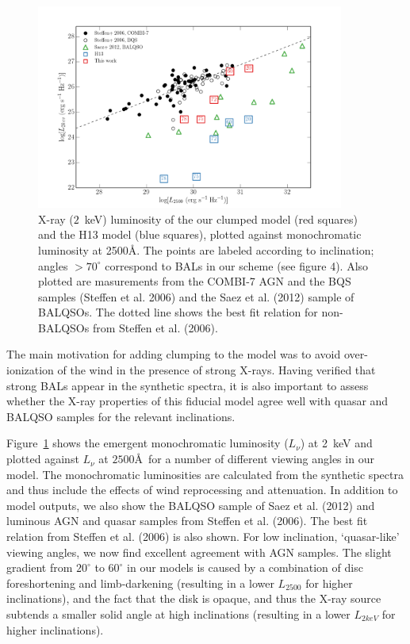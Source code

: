 \documentclass[useAMS,usenatbib]{mn2e_x}
\begin{document}
\begin{figure}
\centering
\includegraphics[width=0.9\textwidth]{figures/lx_a05_pre.png}
\caption
{
X-ray ($2$~keV) luminosity of the our clumped model (red squares) 
and the H13 model (blue squares), plotted against monochromatic luminosity 
at 2500\AA. The points are labeled according to inclination; angles
$>70^\circ$ correspond to BALs in our scheme (see figure 4).
Also plotted are masurements from 
the COMBI-7 AGN and the BQS samples (Steffen et al. 2006) and the Saez et al. (2012) 
sample of BALQSOs. The dotted line shows the best fit relation for non-BALQSOs 
from Steffen et al. (2006).
}
\label{fig:xray}
\end{figure}

The main motivation for adding clumping to the model was
to avoid over-ionization of the wind in the presence of strong X-rays. 
Having verified that strong BALs appear in the synthetic spectra,
it is also important to assess whether the X-ray properties of this
fiducial model agree well with quasar and BALQSO samples for the relevant
inclinations.

Figure~\ref{fig:xray} shows the emergent
monochromatic luminosity ($L_\nu$) at 2~keV and 
plotted against $L_\nu$ at $2500$\AA\ for a number of different viewing angles in our model.
The monochromatic luminosities are calculated from the synthetic spectra and thus include
the effects of wind reprocessing and attenuation. In addition to model outputs,
we also show the BALQSO sample of Saez et al. (2012) and luminous AGN and quasar
samples from Steffen et al. (2006). The best fit relation from Steffen et al. (2006) 
is also shown. For low inclination, `quasar-like' viewing angles,
we now find excellent agreement with AGN samples. The slight gradient from $20^\circ$ to
$60^\circ$ in our models is caused by a combination of disc foreshortening and limb-darkening 
(resulting in a lower $L_{2500}$ for higher inclinations), and the fact that the disk 
is opaque, and thus the X-ray source subtends a smaller solid angle at high inclinations
(resulting in a lower $L_{2keV}$ for higher inclinations). 
\end{document}
